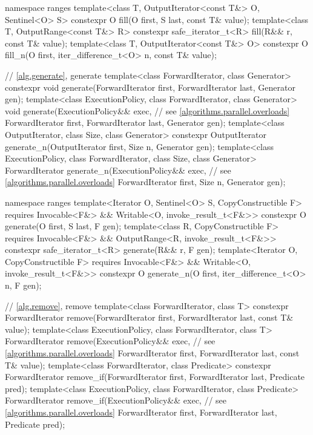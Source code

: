 \begin{codeblock}
{  namespace ranges {
    template<class T, OutputIterator<const T&> O, Sentinel<O> S>
      constexpr O fill(O first, S last, const T& value);
    template<class T, OutputRange<const T&> R>
      constexpr safe_iterator_t<R> fill(R&& r, const T& value);
    template<class T, OutputIterator<const T&> O>
      constexpr O fill_n(O first, iter_difference_t<O> n, const T& value);
  }

  // \ref{alg.generate}, generate
  template<class ForwardIterator, class Generator>
    constexpr void generate(ForwardIterator first, ForwardIterator last,
                            Generator gen);
  template<class ExecutionPolicy, class ForwardIterator, class Generator>
    void generate(ExecutionPolicy&& exec, // see \ref{algorithms.parallel.overloads}
                  ForwardIterator first, ForwardIterator last,
                  Generator gen);
  template<class OutputIterator, class Size, class Generator>
    constexpr OutputIterator generate_n(OutputIterator first, Size n, Generator gen);
  template<class ExecutionPolicy, class ForwardIterator, class Size, class Generator>
    ForwardIterator generate_n(ExecutionPolicy&& exec, // see \ref{algorithms.parallel.overloads}
                               ForwardIterator first, Size n, Generator gen);

  namespace ranges {
    template<Iterator O, Sentinel<O> S, CopyConstructible F>
        requires Invocable<F&> && Writable<O, invoke_result_t<F&>>
      constexpr O generate(O first, S last, F gen);
    template<class R, CopyConstructible F>
        requires Invocable<F&> && OutputRange<R, invoke_result_t<F&>>
      constexpr safe_iterator_t<R> generate(R&& r, F gen);
    template<Iterator O, CopyConstructible F>
        requires Invocable<F&> && Writable<O, invoke_result_t<F&>>
      constexpr O generate_n(O first, iter_difference_t<O> n, F gen);
  }

  // \ref{alg.remove}, remove
  template<class ForwardIterator, class T>
    constexpr ForwardIterator remove(ForwardIterator first, ForwardIterator last,
                                     const T& value);
  template<class ExecutionPolicy, class ForwardIterator, class T>
    ForwardIterator remove(ExecutionPolicy&& exec, // see \ref{algorithms.parallel.overloads}
                           ForwardIterator first, ForwardIterator last,
                           const T& value);
  template<class ForwardIterator, class Predicate>
    constexpr ForwardIterator remove_if(ForwardIterator first, ForwardIterator last,
                                        Predicate pred);
  template<class ExecutionPolicy, class ForwardIterator, class Predicate>
    ForwardIterator remove_if(ExecutionPolicy&& exec, // see \ref{algorithms.parallel.overloads}
                              ForwardIterator first, ForwardIterator last,
                              Predicate pred);

}
\end{codeblock}
